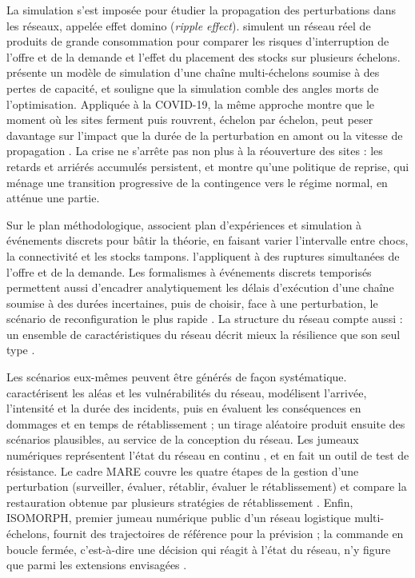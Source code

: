 La simulation s'est imposée pour étudier la propagation des perturbations dans les réseaux, appelée effet domino (\textit{ripple effect}). \citet{schmitt2012} simulent un réseau réel de produits de grande consommation pour comparer les risques d'interruption de l'offre et de la demande et l'effet du placement des stocks sur plusieurs échelons. \citet{ivanov2017} présente un modèle de simulation d'une chaîne multi-échelons soumise à des pertes de capacité, et souligne que la simulation comble des angles morts de l'optimisation. Appliquée à la COVID-19, la même approche montre que le moment où les sites ferment puis rouvrent, échelon par échelon, peut peser davantage sur l'impact que la durée de la perturbation en amont ou la vitesse de propagation \citep{ivanov2020}. La crise ne s'arrête pas non plus à la réouverture des sites : les retards et arriérés accumulés persistent, et \citet{ivanov2019cie} montre qu'une politique de reprise, qui ménage une transition progressive de la contingence vers le régime normal, en atténue une partie.

Sur le plan méthodologique, \citet{macdonald2018} associent plan d'expériences et simulation à événements discrets pour bâtir la théorie, en faisant varier l'intervalle entre chocs, la connectivité et les stocks tampons. \citet{kost2024} l'appliquent à des ruptures simultanées de l'offre et de la demande. Les formalismes à événements discrets temporisés permettent aussi d'encadrer analytiquement les délais d'exécution d'une chaîne soumise à des durées incertaines, puis de choisir, face à une perturbation, le scénario de reconfiguration le plus rapide \citep{rajah2025}. La structure du réseau compte aussi \citep{kim2015} : un ensemble de caractéristiques du réseau décrit mieux la résilience que son seul type \citep{li2020}.

Les scénarios eux-mêmes peuvent être générés de façon systématique. \citet{klibi2012ejor} caractérisent les aléas et les vulnérabilités du réseau, modélisent l'arrivée, l'intensité et la durée des incidents, puis en évaluent les conséquences en dommages et en temps de rétablissement ; un tirage aléatoire produit ensuite des scénarios plausibles, au service de la conception du réseau. Les jumeaux numériques représentent l'état du réseau en continu \citep{ivanovdolgui2021ppc}, et \citet{ivanov2023} en fait un outil de test de résistance. Le cadre MARE couvre les quatre étapes de la gestion d'une perturbation (surveiller, évaluer, rétablir, évaluer le rétablissement) et compare la restauration obtenue par plusieurs stratégies de rétablissement \citep{ramzy2022}. Enfin, ISOMORPH, premier jumeau numérique public d'un réseau logistique multi-échelons, fournit des trajectoires de référence pour la prévision ; la commande en boucle fermée, c'est-à-dire une décision qui réagit à l'état du réseau, n'y figure que parmi les extensions envisagées \citep{zhang2026isomorph}.

